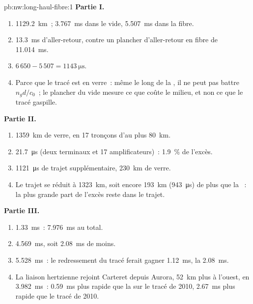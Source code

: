 \begin{solution}{pb:nw:long-haul-fibre:1}
\textbf{Partie I.}
\begin{enumerate}
\item \qty{1129.2}{\kilo\metre}~; \qty{3.767}{\milli\second} dans le vide, \qty{5.507}{\milli\second} dans la fibre.
\item \qty{13.3}{\milli\second} d'aller-retour, contre un plancher d'aller-retour en fibre de \qty{11.014}{\milli\second}.
\item $6\,650 - 5\,507 = \qty{1143}{\micro\second}$.
\item Parce que le tracé est en verre~: même le long de la , il ne peut pas battre $n_g d/c_0$~; le plancher du vide mesure ce que coûte le milieu, et non
  ce que le tracé gaspille.
\end{enumerate}
\textbf{Partie II.}
\begin{enumerate}[resume]
\item \qty{1359}{\kilo\metre} de verre, en 17 tronçons d'au plus \qty{80}{\kilo\metre}.
\item \qty{21.7}{\micro\second} (deux terminaux et 17 amplificateurs)~: 1.9~\% de l'excès.
\item \qty{1121}{\micro\second} de trajet supplémentaire, \qty{230}{\kilo\metre} de verre.
\item Le trajet se réduit à \qty{1323}{\kilo\metre}, soit encore \qty{193}{\kilo\metre} (\qty{943}{\micro\second}) de plus que la ~: la plus grande part
  de l'excès reste dans le trajet.
\end{enumerate}
\textbf{Partie III.}
\begin{enumerate}[resume]
\item \qty{1.33}{\milli\second}~: \qty{7.976}{\milli\second} au total.
\item \qty{4.569}{\milli\second}, soit \qty{2.08}{\milli\second} de moins.
\item \qty{5.528}{\milli\second}~: le redressement du tracé ferait gagner \qty{1.12}{\milli\second}, la  \qty{2.08}{\milli\second}.
\item La liaison hertzienne rejoint Carteret depuis Aurora, \qty{52}{\kilo\metre} plus à l'ouest, en \qty{3.982}{\milli\second}~: \qty{0.59}{\milli\second}
  plus rapide que la  sur le tracé de 2010, \qty{2.67}{\milli\second} plus rapide que le tracé de 2010.

\end{enumerate}
\end{solution}
